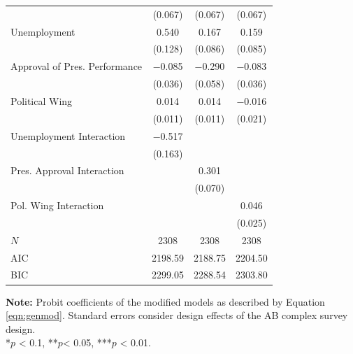 \documentclass[12pt,a4]{article}\usepackage[]{graphicx}\usepackage[]{xcolor}
\begin{document}
\begin{table}[htbp]
\begin{center}
\begin{tabular}[t]{lccc}
 & (\num{0.067}) & (\num{0.067}) & (\num{0.067})\\
Unemployment & \num{0.540} & \num{0.167} & \num{0.159}\\
 & (\num{0.128}) & (\num{0.086}) & (\num{0.085})\\
Approval of Pres. Performance & \num{-0.085} & \num{-0.290} & \num{-0.083}\\
 & (\num{0.036}) & (\num{0.058}) & (\num{0.036})\\
Political Wing & \num{0.014} & \num{0.014} & \num{-0.016}\\
 & (\num{0.011}) & (\num{0.011}) & (\num{0.021})\\
Unemployment Interaction & \num{-0.517} &  & \\
 & (\num{0.163}) &  & \\
Pres. Approval Interaction &  & \num{0.301} & \\
 &  & (\num{0.070}) & \\
Pol. Wing Interaction &  &  & \num{0.046}\\
 &  &  & (\num{0.025})\\
\midrule
$N$ & \num{2308} & \num{2308} & \num{2308}\\
AIC & \num{2198.59} & \num{2188.75} & \num{2204.50}\\
BIC & \num{2299.05} & \num{2288.54} & \num{2303.80}\\
\bottomrule
\end{tabular}


\end{center}
\textbf{Note:} Probit coefficients of the modified models as described by Equation \ref{eqn:genmod}. Standard errors consider design effects of the AB complex survey design.\\
*$p$ < 0.1, **$p$< 0.05, ***$p$ < 0.01.
\end{table}

\end{document}
